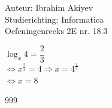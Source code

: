 \documentclass[a4paper]{article}
\begin{document}
\noindent \large Auteur: Ibrahim Akiyev \\
\noindent \large Studierichting: Informatica\\
\noindent \large Oefeningenreeks 2E nr. 18.3\\

\medskip

\normalsize

$\log_{x} 4 = \dfrac{2}{3}$\\

$\Leftrightarrow x^{\tfrac{2}{3}} = 4 \Rightarrow x = 4^{\tfrac{2}{3}}$\\

$\Leftrightarrow x = 8$\\

\begin{thebibliography}{999}
\end{thebibliography}
\end{document}
